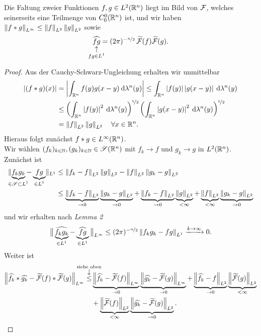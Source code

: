 \documentclass[skript.tex]{subfiles}
\begin{document}
	\begin{cor}
		Die Faltung zweier Funktionen $f,g \in L^2(\mathbb{R}^n)$ liegt im Bild von $\mathcal{F}$, welches seinerseits eine Teilmenge von $C_0^0(\mathbb{R}^n)$ ist, und wir haben $\left\lVert f \ast g \right\rVert_{L^\infty} \leq \left\lVert f \right\rVert_{L^2} \left\lVert g \right\rVert_{L^2}$ sowie
		\[
			\uarrow{fg \in L^1}{\wh{fg}} = (2\pi)^{-\nicefrac{n}{2}}\, \wt{\F}(f)\wt{\F}(g).
		\]
	\end{cor}
	\begin{proof}
		Aus der Cauchy-Schwarz-Ungleichung erhalten wir unmittelbar
		\begin{align*}
			\left| (f \ast g)(x) \right| &= \left| \int_{\mathbb{R}^n} f(y)g(x-y)\: \mathrm{d}\lambda^n(y) \right| \leq \int_{\mathbb{R}^n} \left| f(y) \right|\left| g(x-y) \right|\: \mathrm{d}\lambda^n(y) \\
			&\leq \left(\int_{\mathbb{R}^n} \left| f(y) \right|^2 \: \mathrm{d}\lambda^n(y)\right)^{\nicefrac{1}{2}} \left(\int_{\mathbb{R}^n} \left| g(x-y) \right|^2\: \mathrm{d}\lambda^n(y)\right)^{\nicefrac{1}{2}} \\
			&= \left\lVert f \right\rVert_{L^2} \left\lVert g \right\rVert_{L^2} \quad \forall x \in \mathbb{R}^n.
		\end{align*}
		Hieraus folgt zunächst $f \ast g \in L^\infty(\mathbb{R}^n)$.\\ %
		Wir wählen $(f_k)_{k\in\mathbb{N}},(g_k)_{k\in\mathbb{N}} \in \mathscr{S}(\mathbb{R}^n)$ mit $f_k \to f$ und $g_k \to g$ in $L^2(\mathbb{R}^n)$.
		Zunächst ist
		\begin{align*}
			\lVert \underbrace{f_k g_k}_{\mathclap{\in \ms{S} \sbs L^1}}-\underbrace{fg}_{\mathclap{\in L^1}} \rVert_{L^1} &\leq \norm{f_k-f}_{L^2} \norm{g}_{L^2} - \norm{f}_{L^2} \norm{g_k-g}_{L^2} \\
			&\leq \underbrace{\norm{f_k-f}_{L^2}}_{\to 0} \underbrace{\norm{g_k-g}_{L^2}}_{\to 0} + \underbrace{\norm{f_k-f}_{L^2}}_{\to 0} \underbrace{\norm{g}_{L^2}}_{< \infty} + \underbrace{\norm{f}_{L^2}}_{< \infty}\underbrace{\norm{g_k-g}_{L^2}}_{\to 0}
		\end{align*}
		und wir erhalten nach \emph{Lemma 2}
		\[
			\big\lVert\underbrace{\widehat{f_k g_k}}_{\in L^1} - \underbrace{\widehat{f g}}_{\in L^1}\big\rVert_{L^\infty} \leq (2\pi)^{-\nicefrac{n}{2}} \left\lVert f_k g_k - fg \right\rVert_{L^1} \xrightarrow{k \to \infty} 0.
		\]
		Weiter ist
		\begin{align*}
			\norm{\wh{f_k}\ast\wh{g_k} - \wt{\F}(f) \ast \wt{\F}(g)}_{L^\infty} \darrow{\text{siehe oben}}{\leq}&
			\underbrace{\norm{\wh{f_k}-\wt{\F}(f)}_{L^\infty}}_{\to 0} \underbrace{\norm{\wh{g_k}-\wt{\F}(g)}_{L^\infty}}_{\to 0} + \underbrace{\norm{\wh{f_k}-f}_{L^2}}_{\to 0} \underbrace{\norm{\wt{\F}(g)}_{L^2}}_{< \infty}\\
			&+ \underbrace{\norm{\wt{\F}(f)}_{L^2}}_{< \infty}\underbrace{\norm{\wh{g_k}-\wt{\F}(g)}_{L^2}}_{\to 0}.

\end{align*}
\end{proof}
\end{document}
